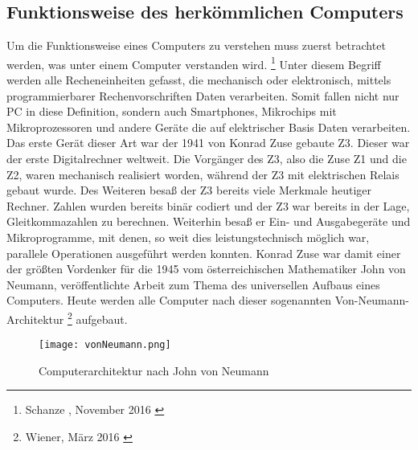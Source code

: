 \documentclass[12pt]{report}
\begin{document}
	\subsection{Funktionsweise des herkömmlichen Computers}
Um die Funktionsweise eines Computers zu verstehen muss zuerst betrachtet werden, was unter einem Computer verstanden wird. \footnote{Schanze , November 2016 \cite{j321-2}} Unter diesem Begriff werden alle Recheneinheiten gefasst, die mechanisch oder elektronisch, mittels programmierbarer Rechenvorschriften Daten verarbeiten. Somit fallen nicht nur PC in diese Definition, sondern auch Smartphones, Mikrochips mit Mikroprozessoren und andere Geräte die auf elektrischer Basis Daten verarbeiten.
Das erste Gerät dieser Art war der 1941 von Konrad Zuse gebaute Z3. Dieser war der erste Digitalrechner weltweit. Die Vorgänger des Z3, also die Zuse Z1 und die Z2, waren mechanisch realisiert worden, während der Z3 mit elektrischen Relais gebaut wurde. Des Weiteren besaß der Z3 bereits viele Merkmale heutiger Rechner. Zahlen wurden bereits binär codiert und der Z3 war bereits in der Lage, Gleitkommazahlen zu berechnen. Weiterhin besaß er Ein- und Ausgabegeräte und Mikroprogramme, mit denen, so weit dies leistungstechnisch möglich war, parallele Operationen ausgeführt werden konnten. Konrad Zuse war damit einer der größten Vordenker für die 1945 vom österreichischen Mathematiker John von Neumann, veröffentlichte Arbeit zum Thema des universellen Aufbaus eines Computers. Heute werden alle Computer nach dieser sogenannten Von-Neumann-Architektur \footnote{Wiener, März 2016 \cite{j321-2}} aufgebaut.

\begin{figure}[h]
\centering
	\texttt{[image: vonNeumann.png]}
 	 \caption{
 	 Computerarchitektur nach John von Neumann
 	 }
 	
\end{figure}
\end{document}
